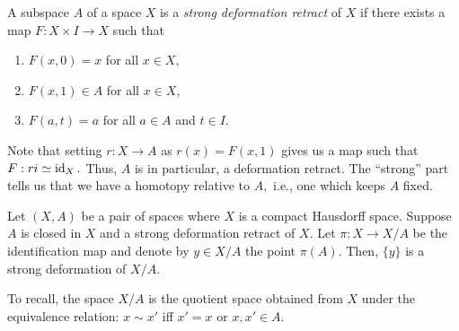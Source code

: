 \documentclass[12pt]{article}
\begin{document}
\begin{defn} \label{defn:strongdefo}
	A subspace $A$ of a space $X$ is a \emph{strong deformation retract} of $X$ if there exists a map $F:X \times I \to X$ such that
	\begin{enumerate}
		\item $F(x, 0) = x$ for all $x \in X,$
		\item $F(x, 1) \in A$ for all $x \in X,$
		\item $F(a, t) = a$ for all $a \in A$ and $t \in I.$
	\end{enumerate}
\end{defn}
Note that setting $r:X \to A$ as $r(x) = F(x, 1)$ gives us a map such that $F:ri \simeq \operatorname{id}_X.$ Thus, $A$ is in particular, a deformation retract. The ``strong'' part tells us that we have a homotopy relative to $A,$ i.e., one which keeps $A$ fixed.

\begin{prop} \label{prop:strongdefretract1}
	Let $(X, A)$ be a pair of spaces where $X$ is a compact Hausdorff space. Suppose $A$ is closed in $X$ and a strong deformation retract of $X.$ Let $\pi:X \to X/A$ be the identification map and denote by $y \in X/A$ the point $\pi(A).$ Then, $\{y\}$ is a strong deformation of $X/A.$
\end{prop}
To recall, the space $X/A$ is the quotient space obtained from $X$ under the equivalence relation: $x \sim x'$ iff $x' = x$ or $x, x' \in A.$
\end{document}
